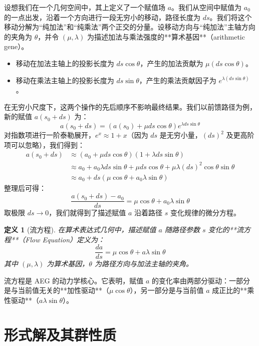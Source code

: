 \documentclass[a4paper,12pt]{book}
\numberwithin{problem}{section}
\newtheorem{definition}{定义}
\numberwithin{definition}{section}
\numberwithin{lemma}{section}
\numberwithin{proposition}{section}
\numberwithin{theorem}{section}
\numberwithin{grammar}{section}
\numberwithin{program}{section}
\numberwithin{convention}{section}
\numberwithin{corollary}{section}
\begin{document}
设想我们在一个几何空间中，其上定义了一个赋值场 $a$。我们从空间中赋值为 $a_0$ 的一点出发，沿着一个方向进行一段无穷小的移动，路径长度为 $ds$。我们将这个移动分解为“纯加法”和“纯乘法”两个正交的分量。设移动方向与“纯加法”主轴方向的夹角为 $\theta$，并令 $(\mu, \lambda)$ 为描述加法与乘法强度的**算术基因**（arithmetic gene）。
\begin{itemize}
    \item 移动在加法主轴上的投影长度为 $ds \cos\theta$，产生的加法贡献为 $\mu (ds \cos\theta)$。
    \item 移动在乘法主轴上的投影长度为 $ds \sin\theta$，产生的乘法贡献因子为 $e^{\lambda (ds \sin\theta)}$。
\end{itemize}
在无穷小尺度下，这两个操作的先后顺序不影响最终结果。我们以前馈路径为例，新的赋值 $a(s_0+ds)$ 为：
\[
a(s_0+ds) = \left( a(s_0) + \mu ds \cos\theta \right) e^{\lambda ds \sin\theta}
\]
对指数项进行一阶泰勒展开，$e^x \approx 1+x$（因为 $ds$ 是无穷小量，$(ds)^2$ 及更高阶项可以忽略），我们得到：
\begin{align*}
    a(s_0+ds) &\approx (a_0 + \mu ds \cos\theta)(1 + \lambda ds \sin\theta) \\
    &\approx a_0 + a_0 \lambda ds \sin\theta + \mu ds \cos\theta + \mu\lambda (ds)^2 \cos\theta \sin\theta \\
    &\approx a_0 + ds( \mu \cos\theta + a_0 \lambda \sin\theta )
\end{align*}
整理后可得：
\[
\frac{a(s_0+ds) - a_0}{ds} = \mu \cos\theta + a_0 \lambda \sin\theta
\]
取极限 $ds \to 0$，我们就得到了描述赋值 $a$ 沿着路径 $s$ 变化规律的微分方程。

\begin{definition}[流方程]
    \label{def:flow_equation}
    在算术表达式几何中，描述赋值 $a$ 随路径参数 $s$ 变化的**流方程**（Flow Equation）定义为：
    \begin{equation}
        \frac{da}{ds} = \mu \cos\theta + a \lambda \sin\theta
        \label{eq:flow_equation}
    \end{equation}
    其中 $(\mu, \lambda)$ 为算术基因，$\theta$ 为路径方向与加法主轴的夹角。
\end{definition}

流方程是 AEG 的动力学核心。它表明，赋值 $a$ 的变化率由两部分驱动：一部分是与当前值无关的**加性驱动**（$\mu \cos\theta$），另一部分是与当前值 $a$ 成正比的**乘性驱动**（$a \lambda \sin\theta$）。

\section{形式解及其群性质}
\label{sec:formal_solution}
\end{document}
